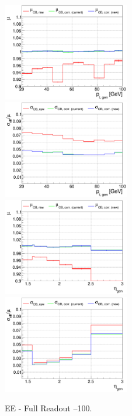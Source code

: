 \begin{figure}
\includegraphics[width=0.495\textwidth]{./plots_pdf/ECAL_plots/plotsNoPU/EE/pdf/FULL/GENPT/EEFULL_GENPT_0020_0100_MuOverBins.pdf}
\includegraphics[width=0.495\textwidth]{./plots_pdf/ECAL_plots/plotsNoPU/EE/pdf/FULL/GENPT/EEFULL_GENPT_0020_0100_EffSigmaOverBins.pdf}
\includegraphics[width=0.495\textwidth]{./plots_pdf/ECAL_plots/plotsNoPU/EE/pdf/FULL/GENETA/EEFULL_GENETA_0020_0100_MuOverBins.pdf}
\includegraphics[width=0.495\textwidth]{./plots_pdf/ECAL_plots/plotsNoPU/EE/pdf/FULL/GENETA/EEFULL_GENETA_0020_0100_EffSigmaOverBins.pdf}
\caption{EE - Full Readout --100\GeV.}
\end{figure}


